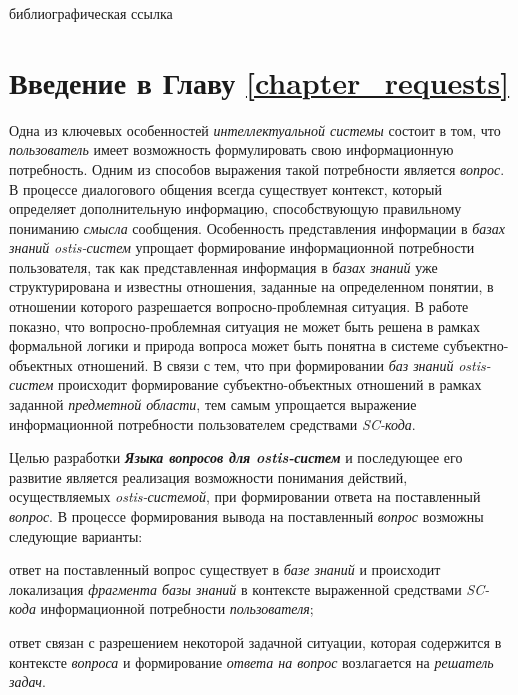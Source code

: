\begin{SCn}
\begin{scnrelfromlist}{библиографическая ссылка}
\end{scnrelfromlist}
	
\end{SCn}

\section*{Введение в Главу \ref{chapter_requests}}

Одна из ключевых особенностей \textit{интеллектуальной системы} состоит в том, что \textit{пользователь} имеет возможность формулировать свою информационную потребность. Одним из способов выражения такой потребности является \textit{вопрос}. В процессе диалогового общения всегда существует контекст, который определяет дополнительную информацию, способствующую правильному пониманию \textit{смысла} сообщения. Особенность представления информации в \textit{базах знаний} \textit{ostis-систем} упрощает формирование информационной потребности пользователя, так как представленная информация в \textit{базах знаний} уже структурирована и известны отношения, заданные на определенном понятии, в отношении которого разрешается вопросно-проблемная ситуация. В работе  показно, что вопросно-проблемная ситуация не может быть решена в рамках формальной логики и природа вопроса может быть понятна в системе субъектно-объектных отношений. В связи с тем, что при формировании \textit{баз знаний} \textit{ostis-систем} происходит формирование субъектно-объектных отношений в рамках заданной \textit{предметной области}, тем самым упрощается выражение информационной потребности пользователем средствами \textit{SC-кода}.   

Целью разработки \textbf{\textit{Языка вопросов для ostis-систем}} и последующее его развитие является реализация возможности понимания действий, осуществляемых \textit{ostis-системой}, при формировании ответа на поставленный \textit{вопрос}. В процессе формирования вывода на поставленный \textit{вопрос} возможны следующие варианты:
\begin{textitemize}
	\item ответ на поставленный вопрос существует в \textit{базе знаний} и происходит локализация \textit{фрагмента базы знаний} в контексте выраженной средствами \textit{SC-кода} информационной потребности \textit{пользователя};
	\item ответ связан с разрешением некоторой задачной ситуации, которая содержится в контексте \textit{вопроса} и формирование \textit{ответа на вопрос} возлагается на \textit{решатель задач}.
\end{textitemize}

